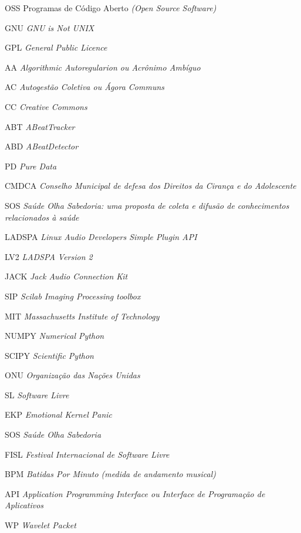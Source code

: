 \resumoeabstract %

\listadefiguras %

\listadetabelas %

	\begin{listaespecial}[BIGNAMEWIDTH]
		\item[OSS] Programas de Código Aberto \emph{(Open Source Software)}
		\item[GNU] \emph{GNU is Not UNIX}
		\item[GPL] \emph{General Public Licence}
                \item[AA] \emph{Algorithmic Autoregularion ou Acrônimo Ambíguo}
                \item[AC] \emph{Autogestão Coletiva ou Ágora Communs}
                \item[CC] \emph{Creative Commons}
                \item[ABT] \emph{ABeatTracker}
                \item[ABD] \emph{ABeatDetector}
                \item[PD] \emph{Pure Data}
                \item[CMDCA] \emph{Conselho Municipal de defesa dos Direitos da Cirança e do Adolescente}
                \item[SOS] \emph{Saúde Olha Sabedoria: uma proposta de coleta e difusão de conhecimentos relacionados à saúde}
                \item[LADSPA] \emph{Linux Audio Developers Simple Plugin API}
                \item[LV2] \emph{LADSPA Version 2}
                \item[JACK] \emph{Jack Audio Connection Kit}
                \item[SIP] \emph{Scilab Imaging Processing toolbox}
                \item[MIT] \emph{Massachusetts Institute of Technology}
                \item[NUMPY] \emph{Numerical Python}
                \item[SCIPY] \emph{Scientific Python}
                \item[ONU] \emph{Organização das Nações Unidas}
                \item[SL] \emph{Software Livre}
                \item[EKP] \emph{Emotional Kernel Panic}
                \item[SOS] \emph{Saúde Olha Sabedoria}
                \item[FISL] \emph{Festival Internacional de Software Livre}
                \item[BPM] \emph{Batidas Por Minuto (medida de andamento musical)}
                \item[API] \emph{Application Programming Interface ou Interface de Programação de Aplicativos}
                \item[WP] \emph{Wavelet Packet}


\end{listaespecial}
